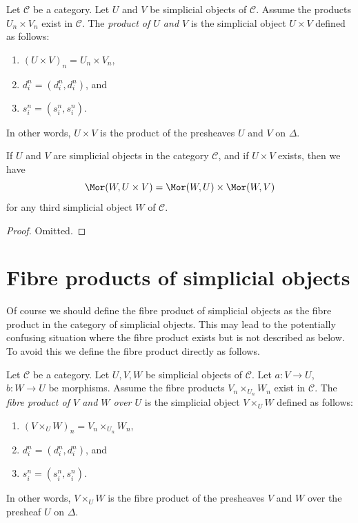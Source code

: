 \begin{definition}
\label{definition-product}
Let $\mathcal{C}$ be a category.
Let $U$ and $V$ be simplicial objects of $\mathcal{C}$.
Assume the products $U_n \times V_n$ exist in $\mathcal{C}$.
The {\it product of $U$ and $V$} is the simplicial object
$U \times V$ defined as follows:
\begin{enumerate}
\item $(U \times V)_n = U_n \times V_n$,
\item $d^n_i = (d^n_i, d^n_i)$, and
\item $s^n_i = (s^n_i, s^n_i)$.
\end{enumerate}
In other words, $U \times V$ is the product of the presheaves
$U$ and $V$ on $\Delta$.
\end{definition}

\begin{lemma}
\label{lemma-product}
If $U$ and $V$ are simplicial objects in the category $\mathcal{C}$,
and if $U \times V$ exists, then we have
$$
\Mor(W, U \times V) =
\Mor(W, U) \times
\Mor(W, V)
$$
for any third simplicial object $W$ of $\mathcal{C}$.
\end{lemma}

\begin{proof}
Omitted.
\end{proof}


\section{Fibre products of simplicial objects}
\label{section-fibre-products}

\noindent
Of course we should define the fibre product of simplicial objects
as the fibre product in the category of simplicial objects. This
may lead to the potentially confusing situation where the
fibre product exists but is not described as below. To avoid
this we define the fibre product directly as follows.

\begin{definition}
\label{definition-fibre-product}
Let $\mathcal{C}$ be a category.
Let $U, V, W$ be simplicial objects of $\mathcal{C}$.
Let $a : V \to U$, $b : W \to U$ be morphisms.
Assume the fibre products $V_n \times_{U_n} W_n$ exist in $\mathcal{C}$.
The {\it fibre product of $V$ and $W$ over $U$} is the simplicial object
$V \times_U W$ defined as follows:
\begin{enumerate}
\item $(V \times_U W)_n = V_n \times_{U_n} W_n$,
\item $d^n_i = (d^n_i, d^n_i)$, and
\item $s^n_i = (s^n_i, s^n_i)$.
\end{enumerate}
In other words, $V \times_U W$ is the fibre product of the presheaves
$V$ and $W$ over the presheaf $U$ on $\Delta$.
\end{definition}

